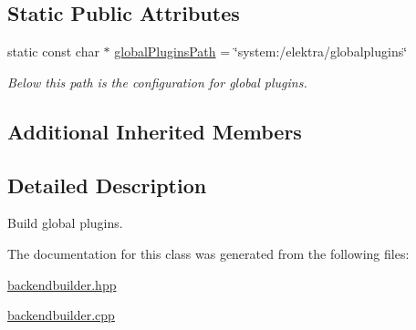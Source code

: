 \subsection*{Static Public Attributes}
\begin{DoxyCompactItemize}
\item 
\mbox{\label{classkdb_1_1tools_1_1GlobalPluginsBuilder_ac4300427e2f9e072378f350c0e112156}} 
static const char $\ast$ \hyperlink{classkdb_1_1tools_1_1GlobalPluginsBuilder_ac4300427e2f9e072378f350c0e112156}{global\+Plugins\+Path} = \char`\"{}system\+:/elektra/globalplugins\char`\"{}
\begin{DoxyCompactList}\small\item\em Below this path is the configuration for global plugins. \end{DoxyCompactList}\end{DoxyCompactItemize}
\subsection*{Additional Inherited Members}


\subsection{Detailed Description}
Build global plugins. 

The documentation for this class was generated from the following files\+:\begin{DoxyCompactItemize}
\item 
\hyperlink{backendbuilder_8hpp}{backendbuilder.\+hpp}\item 
\hyperlink{backendbuilder_8cpp}{backendbuilder.\+cpp}\end{DoxyCompactItemize}
